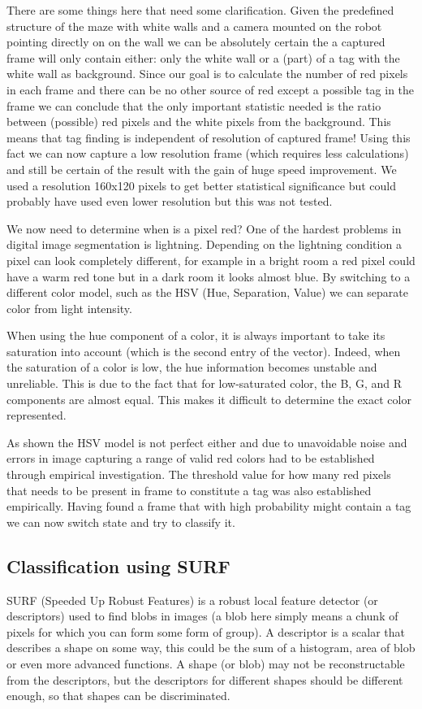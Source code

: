 There are some things here that need some clarification. Given the predefined structure of the maze with white walls and a camera mounted on the robot pointing directly on on the wall we can be absolutely certain the a captured frame will only contain either: only the white wall or a (part) of a tag with the white wall as background. Since our goal is to calculate the number of red pixels in each frame and there can be no other source of red except a possible tag in the frame we can conclude that the only important statistic needed is the ratio between (possible) red pixels and the white pixels from the background. This means that tag finding is independent of resolution of captured frame! Using this fact we can now capture a low resolution frame (which requires less calculations) and still be certain of the result with the gain of huge speed improvement. We used a resolution 160x120 pixels to get better statistical significance but could probably have used even lower resolution but this was not tested.

We now need to determine when is a pixel red? One of the hardest problems in digital image segmentation is lightning. Depending on the lightning condition a pixel can look completely different, for example in a bright room a red pixel could have a warm red tone but in a dark room it looks almost blue. By switching to a different color model, such as the HSV (Hue, Separation, Value) we can separate color from light intensity. 

When using the hue component of a color, it is always important to take its saturation into account (which is the second entry of the vector). Indeed, when the saturation of a color is low, the hue information becomes unstable and unreliable. This is due to the fact that for low-saturated color, the B, G, and R components are almost equal. This makes it difficult
to determine the exact color represented. 

As shown the HSV model is not perfect either and due to unavoidable noise and errors in image capturing a range of valid red colors had to be established through empirical investigation. The threshold value for how many red pixels that needs to be present in frame to constitute a tag was also established empirically. Having found a frame that with high probability might contain a tag we can now switch state and try to classify it.

\subsection{Classification using SURF}
SURF (Speeded Up Robust Features) is a robust local feature detector (or descriptors) used to find blobs in images (a blob here simply means a chunk of pixels for which you can form some form of group).  A descriptor is a scalar that describes a shape on some way, this could be the sum of a histogram, area of blob or even more advanced functions. A shape (or blob) may not be reconstructable from the descriptors, but the descriptors for different shapes should be different enough, so that shapes can be discriminated.

